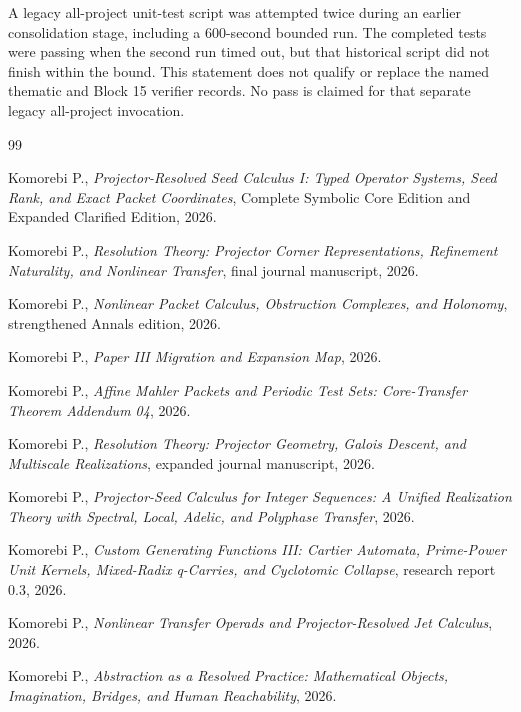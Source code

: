 \documentclass[11pt]{article}
\theoremstyle{definition}
\theoremstyle{remark}
\begin{document}




A legacy all-project unit-test script was attempted twice during an earlier consolidation stage, including a 600-second bounded run. The completed tests were passing when the second run timed out, but that historical script did not finish within the bound. This statement does not qualify or replace the named thematic and Block 15 verifier records. No pass is claimed for that separate legacy all-project invocation.

\clearpage
\begin{thebibliography}{99}

Komorebi P., \emph{Projector-Resolved Seed Calculus I: Typed Operator Systems, Seed Rank, and Exact Packet Coordinates}, Complete Symbolic Core Edition and Expanded Clarified Edition, 2026.

Komorebi P., \emph{Resolution Theory: Projector Corner Representations, Refinement Naturality, and Nonlinear Transfer}, final journal manuscript, 2026.

Komorebi P., \emph{Nonlinear Packet Calculus, Obstruction Complexes, and Holonomy}, strengthened Annals edition, 2026.

Komorebi P., \emph{Paper III Migration and Expansion Map}, 2026.

Komorebi P., \emph{Affine Mahler Packets and Periodic Test Sets: Core-Transfer Theorem Addendum 04}, 2026.

Komorebi P., \emph{Resolution Theory: Projector Geometry, Galois Descent, and Multiscale Realizations}, expanded journal manuscript, 2026.

Komorebi P., \emph{Projector-Seed Calculus for Integer Sequences: A Unified Realization Theory with Spectral, Local, Adelic, and Polyphase Transfer}, 2026.

Komorebi P., \emph{Custom Generating Functions III: Cartier Automata, Prime-Power Unit Kernels, Mixed-Radix q-Carries, and Cyclotomic Collapse}, research report 0.3, 2026.

Komorebi P., \emph{Nonlinear Transfer Operads and Projector-Resolved Jet Calculus}, 2026.

Komorebi P., \emph{Abstraction as a Resolved Practice: Mathematical Objects, Imagination, Bridges, and Human Reachability}, 2026.


\end{thebibliography}
\end{document}
